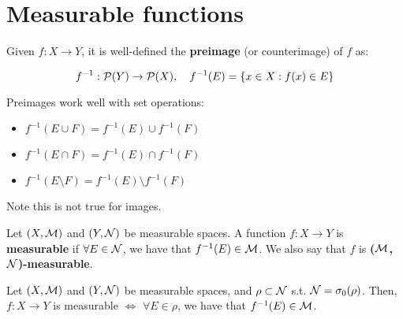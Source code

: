 \chapter{Measurable functions}

\begin{fdefinition}
    Given $f: X \to Y$, it is well-defined the \textbf{preimage} (or 
    counterimage) of $f$ as:

    $$f^{-1}: \mathcal{P}(Y) \to \mathcal{P}(X), \quad f^{-1}(E) = \{x \in X: f(x) \in E\}$$
\end{fdefinition}

\begin{fremark}
    Preimages work well with set operations:
    \begin{itemize}
        \item $f^{-1}(E \cup F) = f^{-1}(E) \cup f^{-1}(F)$
        \item $f^{-1}(E \cap F) = f^{-1}(E) \cap f^{-1}(F)$
        \item $f^{-1}(E \setminus F) = f^{-1}(E) \setminus f^{-1}(F)$
    \end{itemize}

    Note this is not true for images.
\end{fremark}

\vspace{1em}

\begin{fdefinition}
    Let $(X, \mathcal{M})$ and $(Y, \mathcal{N})$ be measurable spaces. A function $f: X \to Y$ is 
    \textbf{measurable} if $\forall E \in \mathcal{N}$, we have that $f^{-1}(E) \in \mathcal{M}$.
    We also say that $f$ is \textbf{($\mathcal{M}$,$\mathcal{N}$)-measurable}.
\end{fdefinition}

\vspace{1em}

\begin{fproposition}
    Let $(X, \mathcal{M})$ and $(Y, \mathcal{N})$ be measurable spaces, and $\rho \subset \mathcal{N}$ s.t.
    $\mathcal{N} = \sigma_0(\rho)$. Then, $f: X \to Y$ is measurable $\iff$ $\forall E \in \rho$,
    we have that $f^{-1}(E) \in \mathcal{M}$.
\end{fproposition}


